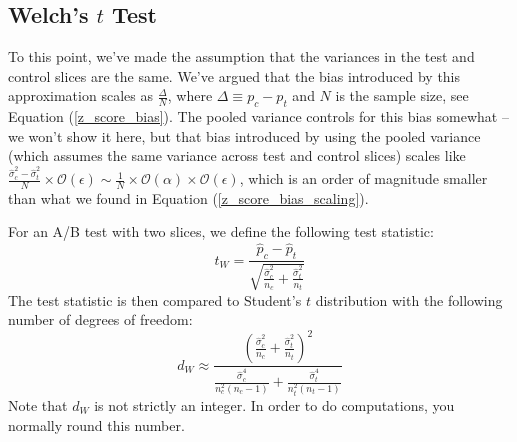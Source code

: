 \documentclass{article}
\numberwithin{equation}{section}
\begin{document}
\subsection{Welch's $t$ Test}
To this point, we've made the assumption that the variances in the test and control slices are the same. We've argued that the bias introduced by this approximation scales as $\frac{\Delta}{N}$, where $\Delta \equiv p_c - p_t$ and $N$ is the sample size, see Equation (\ref{z_score_bias}). The pooled variance controls for this bias somewhat -- we won't show it here, but that bias introduced by using the pooled variance (which assumes the same variance across test and control slices) scales like $\frac{\hat{\sigma}_c^2 - \hat{\sigma}^2_t}{N}\times\mathcal{O}(\epsilon) \sim \frac{1}{N} \times \mathcal{O}(\alpha) \times \mathcal{O}(\epsilon)$, which is an order of magnitude smaller than what we found in Equation (\ref{z_score_bias_scaling}). 

For an A/B test with two slices, we define the following test statistic:
\begin{equation} \label{welchs_t_stat}
	t_W = \frac{\hat{p}_c - \hat{p}_t}{\sqrt{\frac{\hat{\sigma}_c^2}{n_c} + \frac{\hat{\sigma}_t^2}{n_t}}}
\end{equation}
The test statistic is then compared to Student's $t$ distribution with the following number of degrees of freedom:
\begin{equation} \label{welchs_dof}
	d_W \approx \frac{\left(\frac{\hat{\sigma}_c^2}{n_c} + \frac{\hat{\sigma}_t^2}{n_t}\right)^2}{\frac{\hat{\sigma}_c^4}{n_c^2 \left(n_c-1\right)} + \frac{\hat{\sigma}_t^4}{n_t^2 \left(n_t- 1\right)}}
\end{equation}
Note that $d_W$ is not strictly an integer. In order to do computations, you normally round this number.
\end{document}
